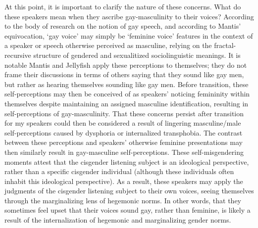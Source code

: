 \documentclass[12pt,twoside]{reedthesis}
\begin{document}
At this point, it is important to clarify the nature of these concerns. What do these speakers mean when they ascribe gay-masculinity to their voices? According to the body of research on the notion of gay speech, and according to Mantis' equivocation, `gay voice' may simply be `feminine voice' features in the context of a speaker or speech otherwise perceived as masculine, relying on the fractal-recursive structure of gendered and sexualitized sociolinguistic meanings. It is notable Mantis and Jellyfish apply these perceptions to themselves; they do not frame their discussions in terms of others saying that they sound like gay men, but rather as hearing themselves sounding like gay men. Before transition, these self-perceptions may then be conceived of as speakers'  noticing femininity within themselves despite maintaining an assigned masculine identification, resulting in self-perceptions of gay-masculinity. That these concerns persist after transition for my speakers could then be considered a result of lingering masculine/male self-perceptions caused by dysphoria or internalized transphobia. The contrast between these perceptions and speakers' otherwise feminine presentations may then similarly result in gay-masculine self-perceptions. These self-misgendering moments attest that the cisgender listening subject is an ideological perspective, rather than a specific cisgender individual (although these individuals often inhabit this ideological perspective). As a result, these speakers may apply the judgments of the cisgender listening subject to their own voices, seeing themselves through the marginalizing lens of hegemonic norms. In other words, that they sometimes feel upset that their voices sound gay, rather than feminine, is likely a result of the internalization of hegemonic and marginalizing gender norms.
\end{document}

